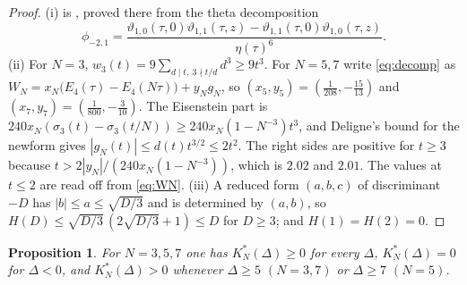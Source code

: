\documentclass[11pt]{amsart}
\numberwithin{equation}{section}
\theoremstyle{plain}
\newtheorem{prop}[thm]{Proposition}
\theoremstyle{remark}
\newcommand{\pmi}{\phi_{-2,1}}
\begin{document}
\begin{proof}
(i) is \cite[Lemma~4(i)]{Bha26a}, proved there from the theta decomposition \cite{BM13}\[\pmi=\frac{\vartheta_{1,0}(\tau,0)\vartheta_{1,1}(\tau,z)-\vartheta_{1,1}(\tau,0)\vartheta_{1,0}(\tau,z)}{\eta(\tau)^6}.\] (ii) For $N=3$, $w_3(t)=9\sum_{d\mid t,\ 3\nmid t/d}d^3\ge9t^3$. For $N=5,7$ write \eqref{eq:decomp} as $W_N=x_N\bigl(E_4(\tau)-E_4(N\tau)\bigr)+y_Ng_N$, so $(x_5,y_5)=(\tfrac1{208},-\tfrac{15}{13})$ and $(x_7,y_7)=(\tfrac1{800},-\tfrac3{10})$. The Eisenstein part is $240x_N(\sigma_3(t)-\sigma_3(t/N))\ge240x_N(1-N^{-3})t^3$, and Deligne's bound \cite{Del74} for the newform gives $|g_N(t)|\le d(t)t^{3/2}\le2t^2$. The right sides are positive for $t\ge3$ because $t>2|y_N|/(240x_N(1-N^{-3}))$, which is $2.02$ and $2.01$. The values at $t\le2$ are read off from \eqref{eq:WN}. (iii) A reduced form $(a,b,c)$ of discriminant $-D$ has $|b|\le a\le\sqrt{D/3}$ and is determined by $(a,b)$, so $H(D)\le\sqrt{D/3}\,(2\sqrt{D/3}+1)\le D$ for $D\ge3$; and $H(1)=H(2)=0$.
\end{proof}

\begin{prop}\label{prop:sign}
For $N=3,5,7$ one has $K^*_N(\Delta)\ge0$ for every $\Delta$, $K^*_N(\Delta)=0$ for $\Delta<0$, and $K^*_N(\Delta)>0$ whenever $\Delta\ge5$ $(N=3,7)$ or $\Delta\ge7$ $(N=5)$.
\end{prop}
\end{document}
